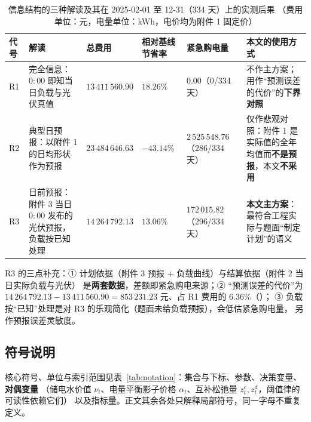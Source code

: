 \begin{table}[htbp]
  \centering
  \caption{信息结构的三种解读及其在 2025-02-01 至 12-31（334 天）上的实测后果
           （费用单位：元，电量单位：kWh，电价均为附件 1 固定价）}
  \label{tab:infostruct}
  \footnotesize
  \setlength{\tabcolsep}{3pt}
  \begin{tabularx}{\linewidth}{C{0.7cm} L{2.95cm} C{2.25cm} C{1.35cm} C{2.15cm} Y}
    \toprule
    代号 & 解读 & 总费用 & 相对基线节省率 & 紧急购电量 & 本文的使用方式 \\
    \midrule
    R1 & 完全信息：\(0{:}00\) 即知当日负载与光伏真值
      & \(13\,411\,560.90\) & \(18.26\%\) & \(0.00\)（0/334 天）
      & 不作主方案；用作“预测误差的代价”的\textbf{下界对照} \\
    R2 & 典型日预报：以附件 1 的日均形状作为预报
      & \(23\,484\,646.63\) & \(-43.14\%\) & \(2\,525\,548.76\)（286/334 天）
      & 仅作悲观对照：附件 1 是实际值的全年均值而\textbf{不是预报}，本文\textbf{不采用} \\
    R3 & 日前预报：附件 3 当日 \(0{:}00\) 发布的光伏预报，负载按已知处理
      & \(14\,264\,792.13\) & \(13.06\%\) & \(172\,015.82\)（296/334 天）
      & \textbf{本文主方案}：最符合工程实际与题面“制定计划”的语义 \\
    \bottomrule
  \end{tabularx}
\end{table}

R3 的三点补充：① 计划依据（附件 3 预报 \(+\) 负载曲线）与结算依据（附件 2 当日实际负载与光伏）
是\textbf{两套数据}，差额即紧急购电来源；② “预测误差的代价”为
\(14\,264\,792.13-13\,411\,560.90=853\,231.23\) 元、占 R1 费用的 \(6.36\%\)（）；
③ 负载按“已知”处理是对 R3 的乐观简化（题面未给负载预报），会低估紧急购电量，
另作预报误差灵敏度。

\subsection{符号说明}\label{sec:notation}

核心符号、单位与索引范围见表~\ref{tab:notation}：集合与下标、参数、决策变量、\textbf{对偶变量}
（储电水价值 \(\nu_t\)、电量平衡影子价格 \(\alpha_t\)、互补松弛量 \(z^c_t,z^d_t\)，阈值律的可读性依赖它们）
以及指标量。正文其余各处只解释局部符号，同一字母不重复定义。

